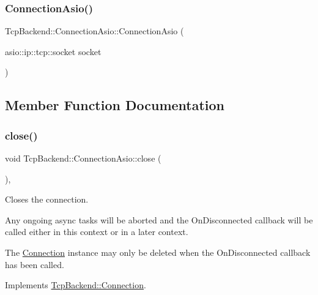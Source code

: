 \subsubsection{\texorpdfstring{Connection\+Asio()}{ConnectionAsio()}}
{\footnotesize\ttfamily Tcp\+Backend\+::\+Connection\+Asio\+::\+Connection\+Asio (\begin{DoxyParamCaption}\item[{asio\+::ip\+::tcp\+::socket}]{socket }\end{DoxyParamCaption})}



\subsection{Member Function Documentation}
\mbox{\label{classTcpBackend_1_1ConnectionAsio_a4601c22735a27b1a835bfa73d9842848}} 
\subsubsection{\texorpdfstring{close()}{close()}}
{\footnotesize\ttfamily void Tcp\+Backend\+::\+Connection\+Asio\+::close (\begin{DoxyParamCaption}{ }\end{DoxyParamCaption})\hspace{0.3cm}{\ttfamily [override]}, {\ttfamily [virtual]}}



Closes the connection. 

Any ongoing async tasks will be aborted and the On\+Disconnected callback will be called either in this context or in a later context.

The \hyperlink{classTcpBackend_1_1Connection}{Connection} instance may only be deleted when the On\+Disconnected callback has been called. 

Implements \hyperlink{classTcpBackend_1_1Connection_aa3cbc715deb54c286149457c7819f514}{Tcp\+Backend\+::\+Connection}.

\mbox{\label{classTcpBackend_1_1ConnectionAsio_a97faa75722fa9034ba03cf32512a6f22}} 
